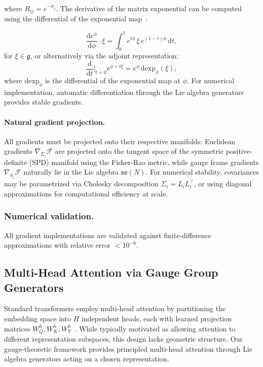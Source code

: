 \documentclass[twoside,11pt]{article}
\begin{document}
where $R_{ij} = e^{-\phi_j}$. The derivative of the matrix exponential can be computed using the differential of the exponential map~\citep{gallier2020differential}:

\begin{equation}
\frac{\mathrm{d} e^{\phi}}{\mathrm{d}\phi} \cdot \xi = \int_0^1 e^{t\phi} \, \xi \, e^{(1-t)\phi} \, \mathrm{d}t,
\label{eq:matrix_exp_differential}
\end{equation}
for $\xi \in \mathfrak{g}$, or alternatively via the adjoint representation:
\begin{equation}
\frac{\mathrm{d}}{\mathrm{d}t}\Big|_{t=0} e^{\phi + t\xi} = e^{\phi} \, \mathrm{dexp}_\phi(\xi),
\label{eq:matrix_exp_adjoint}
\end{equation}
where $\mathrm{dexp}_\phi$ is the differential of the exponential map at $\phi$. For numerical implementation, automatic differentiation through the Lie algebra generators provides stable gradients.

\paragraph{Natural gradient projection.}
All gradients must be projected onto their respective manifolds: Euclidean gradients $\nabla_{\Sigma_i} \mathcal{F}$ are projected onto the tangent space of the symmetric positive-definite (SPD) manifold using the Fisher-Rao metric, while gauge frame gradients $\nabla_{\phi_i} \mathcal{F}$ naturally lie in the Lie algebra $\mathfrak{so}(N)$. For numerical stability, covariances may be parametrized via Cholesky decomposition $\Sigma_i = L_i L_i^\top$, or using diagonal approximations for computational efficiency at scale.

\subsubsection{Numerical validation.}
All gradient implementations are validated against finite-difference approximations with relative error $<10^{-6}$.


\subsection{Multi-Head Attention via Gauge Group Generators}

Standard transformers employ multi-head attention by partitioning the embedding space into $H$ independent heads, each with learned projection matrices $W_Q^h, W_K^h, W_V^h$~\citep{vaswani2017attention}. While typically motivated as allowing attention to different representation subspaces, this design lacks geometric structure. Our gauge-theoretic framework provides principled multi-head attention through Lie algebra generators acting on a chosen representation.
\end{document}
